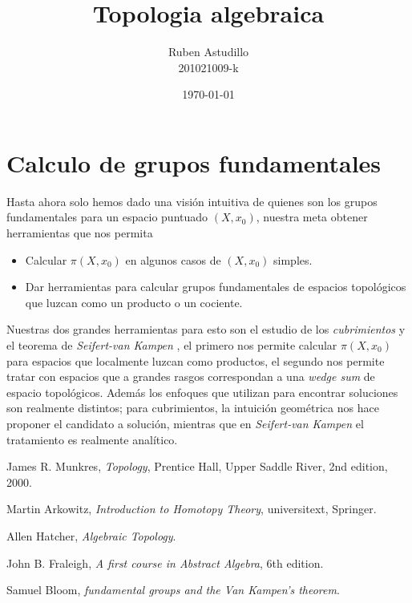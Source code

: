 \documentclass[letterpaper]{article}
\newcommand{\vank}{\emph{Seifert-van Kampen} }
\theoremstyle{definition}
\theoremstyle{plain}
\theoremstyle{plain}
\theoremstyle{plain}
\theoremstyle{remark}
\theoremstyle{remark}
\begin{document}
\title{Topologia algebraica}
\author{Ruben Astudillo \\ 201021009-k}
\date{\today}
\maketitle


\tableofcontents



\section{Calculo de grupos fundamentales}
Hasta ahora solo hemos dado una visión intuitiva de quienes son los
grupos fundamentales para un espacio puntuado \((X,x_0)\), nuestra meta
obtener herramientas que nos permita
\begin{itemize}
\item Calcular \(\pi (X, x_0)\) en algunos casos de \((X,x_0)\) simples.
\item Dar herramientas para calcular grupos fundamentales de espacios
  topológicos que luzcan como un producto o un cociente.
\end{itemize}
Nuestras dos grandes herramientas para esto son el estudio de los
\emph{cubrimientos} y el teorema de \vank , el primero nos permite
calcular \(\pi (X, x_0)\) para espacios que localmente luzcan como
productos, el segundo nos permite tratar con espacios que a grandes
rasgos correspondan a una \emph{wedge sum} de espacio topológicos.
Además los enfoques que utilizan para encontrar soluciones son realmente
distintos; para cubrimientos, la intuición geométrica nos hace
proponer el candidato a solución, mientras que en \vank el tratamiento
es realmente analítico.




\begin{thebibliography}{9}

  James R. Munkres,
  \emph{Topology},
  Prentice Hall, Upper Saddle River,
  2nd edition,
  2000.

  Martin Arkowitz,
  \emph{Introduction to Homotopy Theory},
  universitext, Springer.

  Allen Hatcher,
  \emph{Algebraic Topology}.

  John B. Fraleigh,
  \emph{A first course in Abstract Algebra},
  6th edition.

  Samuel Bloom,
  \emph{fundamental  groups  and  the  Van  Kampen’s theorem}.
\end{thebibliography}
\end{document}
